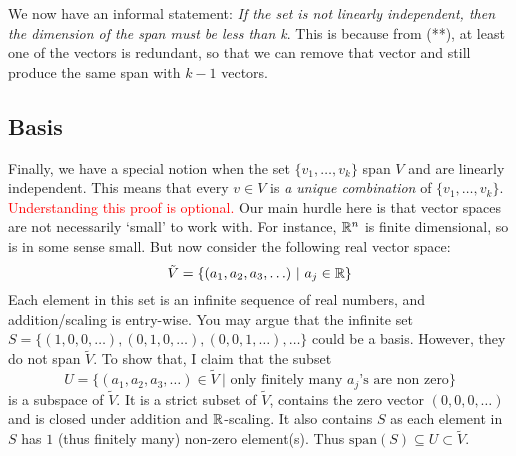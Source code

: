 We now have an informal statement: \textit{If the set is not linearly independent, then the dimension of the span must be less than k}.
This is because from (**), at least one of the vectors is redundant, so that we can remove that vector and still produce the same span with $k-1$ vectors.
\subsection{Basis}

Finally, we have a special notion when the set $\{{v}_1,\ldots,v_k\}$ span $V$ and are linearly independent. This means that every $v\in V$ is
\textit{a unique combination} of $\{{v}_1,\ldots,v_k\}$.
\textcolor{red}{Understanding this proof is optional.} Our main hurdle here is that vector spaces are not necessarily `small' to work with.
For instance, $\mathbb{R}^n$ is finite dimensional, so is in some sense small. But now consider the following real vector space:\[
	\tilde{V}=\{(a_1,a_2,a_3,\ldots) \ | \ a_j\in\reals \}
\]
Each element in this set is an infinite sequence of real numbers, and addition/scaling is entry-wise.
You may argue that the infinite set $S=\{(1,0,0,\ldots), (0,1,0,\ldots),(0,0,1,\ldots),\ldots\}$ could be a basis. However,
they do not span $\tilde{V}$. To show that, I claim that the subset \[
U = \{(a_1,a_2,a_3,\ldots)\in\tilde{V} \ | \textrm{ only finitely many $a_j$'s are non zero}\}
\]
is a subspace of $\tilde{V}$. It is a strict subset of $\tilde{V}$, contains the zero vector $(0,0,0,\ldots)$ and is closed
under addition and $\mathbb{R}$-scaling.
It also contains $S$ as each element in $S$ has $1$ (thus finitely many) non-zero element(s).
Thus $\textrm{span}(S)\subseteq U \subset \tilde{V}$.


